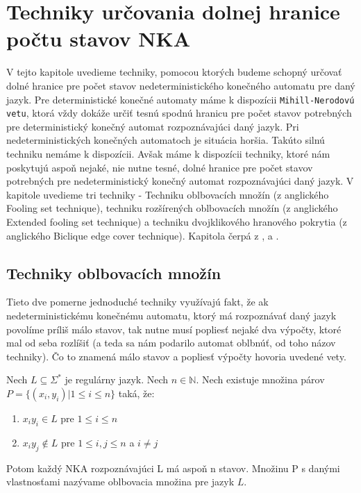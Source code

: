 \chapter[Techniky určovania dolnej hranice počtu stavov NKA]{Techniky určovania dolnej hranice počtu stavov NKA}
\label{kap:lower_bounds}

V tejto kapitole uvedieme techniky, pomocou ktorých budeme schopný určovať dolné hranice pre počet stavov nedeterministického konečného automatu pre daný jazyk. Pre deterministické konečné automaty máme k dispozícii \verb'Mihill-Nerodovú vetu', ktorá vždy dokáže určiť tesnú spodnú hranicu pre počet stavov potrebných pre deterministický konečný automat rozpoznávajúci daný jazyk. Pri nedeterministických konečných automatoch je situácia horšia. Takúto silnú techniku nemáme k dispozícii. Avšak máme k dispozícii techniky, ktoré nám poskytujú aspoň nejaké, nie nutne tesné, dolné hranice pre počet stavov potrebných pre nedeterministický konečný automat rozpoznávajúci daný jazyk. V kapitole uvedieme tri techniky -  Techniku oblbovacích množín (z anglického Fooling set technique), techniku rozšírených oblbovacích množín (z anglického Extended fooling set technique) a techniku dvojklikového hranového pokrytia (z anglického Biclique edge cover technique). Kapitola čerpá z \cite{Palioudakis2012}, \cite{GruberHolzer2006} a \cite{GlaisterShalit1996}.

\section{Techniky oblbovacích množín}
Tieto dve pomerne jednoduché techniky využívajú fakt, že ak nedeterministickému konečnému automatu, ktorý má rozpoznávať daný jazyk povolíme príliš málo stavov, tak nutne musí popliesť nejaké dva výpočty, ktoré mal od seba rozlíšiť (a teda sa nám podarilo automat oblbnúť, od toho názov techniky). Čo to znamená málo stavov a popliesť výpočty hovoria uvedené vety.

\begin{theorem}
\label{thm:fooling_set_technique}
Nech $ L \subseteq \Sigma^{*} $ je regulárny jazyk. Nech $ n \in \mathbb{N} $. Nech existuje množina párov $ P = \lbrace (x_{i},y_{i}) | 1 \leq i \leq n \rbrace $ taká, že: 

\begin{enumerate}[label=(\alph*)]
\item $x_{i}y_{i} \in L$ pre $1 \leq i \leq n$
\item $x_{i}y_{j} \notin L$ pre $1 \leq i,j \leq n$ a $i \neq j$
\end{enumerate}

Potom každý NKA rozpoznávajúci L má aspoň n stavov. Množinu P s danými vlastnosťami nazývame oblbovacia množina pre jazyk $ L $.

\end{theorem}

